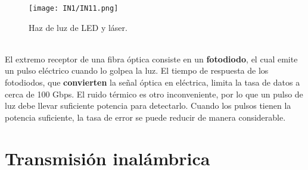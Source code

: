 \documentclass[
	12pt, %
	fleqn, %
	a4paper, %
]{LegrandOrangeBook}
\begin{document}
\begin{figure}[]
\centering
\texttt{[image: IN1/IN11.png]}
\caption{Haz de luz de LED y láser.}
\end{figure}
\\El extremo receptor de una fibra óptica consiste en un \textbf{fotodiodo}, el cual emite un pulso eléctrico cuando lo golpea la luz. El tiempo de respuesta de los fotodiodos, que \textbf{convierten} la señal óptica en eléctrica, limita la tasa de datos a cerca de 100 Gbps. El ruido térmico es otro inconveniente, por lo que un pulso de luz debe llevar suficiente potencia para detectarlo. Cuando los pulsos tienen la potencia suficiente, la tasa de error se puede reducir de manera considerable.
\section{Transmisión inalámbrica}
\end{document}

